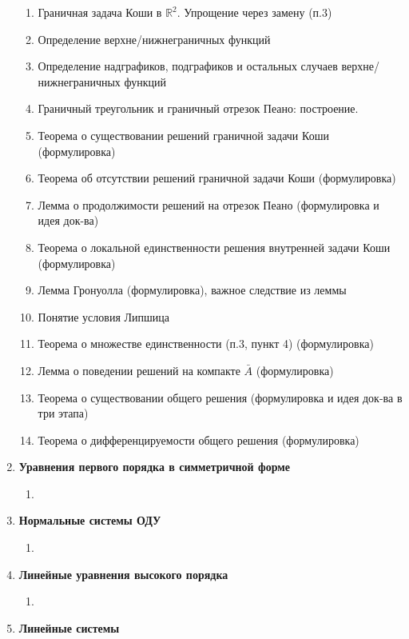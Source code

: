 \documentclass[fleqn]{article}
\begin{document}
\begin{enumerate}[start = 1, label =\textbf{Глава \arabic*.}]
\begin{enumerate}[label=1.\arabic*.]
				\item Граничная задача Коши в $\mathbb{R}^2$. Упрощение через замену (п.3)
				\item Определение верхне/нижнеграничных функций
				\item Определение надграфиков, подграфиков и остальных случаев верхне/нижнеграничных функций
				\item Граничный треугольник и граничный отрезок Пеано: построение.
				\item Теорема о существовании решений граничной задачи Коши (формулировка)
				\item Теорема об отсутствии решений граничной задачи Коши (формулировка)
				\item Лемма о продолжимости решений на отрезок Пеано (формулировка и идея док-ва)
				\item Теорема о локальной единственности решения внутренней задачи Коши (формулировка)
				\item Лемма Гронуолла (формулировка), важное следствие из леммы
				\item Понятие условия Липшица
				\item Теорема о множестве единственности (п.3, пункт 4) (формулировка)
				\item Лемма о поведении решений на компакте $\bar{A}$ (формулировка)
				\item Теорема о существовании общего решения (формулировка и идея док-ва в три этапа)
				\item Теорема о дифференцируемости общего решения (формулировка)
			\end{enumerate}
		\item \textbf{Уравнения первого порядка в симметричной форме}
			\begin{enumerate}[label=2.\arabic*.]
				\item 
			\end{enumerate}
		\item \textbf{Нормальные системы ОДУ}
			\begin{enumerate}[label=3.\arabic*.]
				\item 
			\end{enumerate}
		\item \textbf{Линейные уравнения высокого порядка}
			\begin{enumerate}[label=4.\arabic*.]
				\item 
			\end{enumerate}
		\item \textbf{Линейные системы}
			\begin{enumerate}[label=5.\arabic*.]

\end{enumerate}
\end{enumerate}
\end{document}
